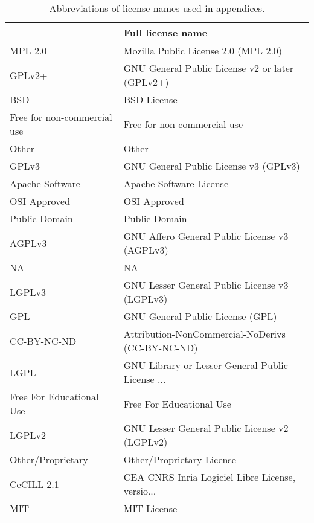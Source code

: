 \begin{table}
\centering
\caption{Abbreviations of license names used in appendices.}
\label{tab:keys-licenses}
\begin{tabular}{ll}
\toprule
{} &                                  Full license name \\
\midrule
MPL 2.0                      &               Mozilla Public License 2.0 (MPL 2.0) \\
GPLv2+                       &    GNU General Public License v2 or later (GPLv2+) \\
 BSD                         &                                        BSD License \\
 Free for non-commercial use &                        Free for non-commercial use \\
 Other                       &                                              Other \\
GPLv3                        &              GNU General Public License v3 (GPLv3) \\
 Apache Software             &                            Apache Software License \\
 OSI Approved                &                                       OSI Approved \\
 Public Domain               &                                      Public Domain \\
AGPLv3                       &      GNU Affero General Public License v3 (AGPLv3) \\
 NA                          &                                                 NA \\
LGPLv3                       &      GNU Lesser General Public License v3 (LGPLv3) \\
GPL                          &                   GNU General Public License (GPL) \\
CC-BY-NC-ND                  &   Attribution-NonCommercial-NoDerivs (CC-BY-NC-ND) \\
LGPL                         &   GNU Library or Lesser General Public License ... \\
 Free For Educational Use    &                           Free For Educational Use \\
LGPLv2                       &      GNU Lesser General Public License v2 (LGPLv2) \\
 Other/Proprietary           &                          Other/Proprietary License \\
CeCILL-2.1                   &   CEA CNRS Inria Logiciel Libre License, versio... \\
 MIT                         &                                        MIT License \\
\bottomrule
\end{tabular}
\end{table}

